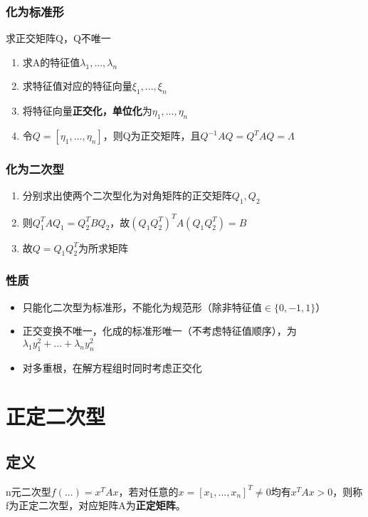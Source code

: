 \subsubsection{化为标准形}
求正交矩阵Q，Q不唯一
\begin{enumerate}
    \item 求A的特征值\(\lambda_1, ..., \lambda_n\)
    \item 求特征值对应的特征向量\(\xi_1, ..., \xi_n\)
    \item 将特征向量\textbf{正交化，单位化}为\(\eta_1, ..., \eta_n\)
    \item 令\(Q = [\eta_1, ..., \eta_n]\)，则Q为正交矩阵，且\(Q^{-1}AQ = Q^TAQ = \Lambda\)
\end{enumerate}

\subsubsection{化为二次型}
\begin{enumerate}
    \item 分别求出使两个二次型化为对角矩阵的正交矩阵\(Q_1, Q_2\)
    \item 则\(Q_1^TAQ_1 = Q_2^TBQ_2\)，故\((Q_1Q_2^T)^TA(Q_1Q_2^T) = B\)
    \item 故\(Q = Q_1Q_2^T\)为所求矩阵
\end{enumerate}


\subsubsection{性质}
\begin{itemize}
    \item 只能化二次型为标准形，不能化为规范形（除非特征值\(\in \{0, -1, 1\}\)）
    \item 正交变换不唯一，化成的标准形唯一（不考虑特征值顺序），为\(\lambda_1y_1^2 + ... + \lambda_ny_n^2\)
    \item 对多重根，在解方程组时同时考虑正交化
\end{itemize}


\section{正定二次型}

\subsection{定义}
n元二次型\(f(...) = x^TAx\)，若对任意的\(x = [x_1,..., x_n]^T \neq 0\)均有\(x^TAx > 0\)，则称f为正定二次型，对应矩阵A为\textbf{正定矩阵}。



